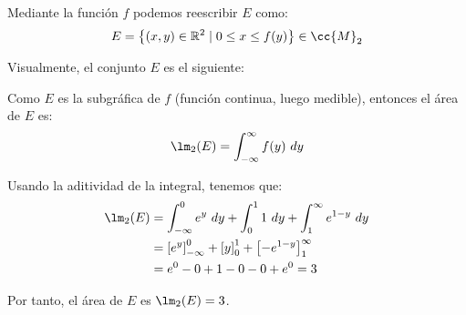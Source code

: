 \begin{ejercicio}
    Mediante la función $f$ podemos reescribir $E$ como:
    \[ E = \left\{ (x, y) \in \mathbb{R}^2 \mid 0 \leq x \leq f(y) \right\}\in \cc{M}_2 \]

    Visualmente, el conjunto $E$ es el siguiente:
    \begin{figure}[H]
        \centering
    \end{figure}

    Como $E$ es la subgráfica de $f$ (función continua, luego medible), entonces el área de $E$ es:
    \begin{equation*}
        \lm_2(E) = \int_{-\infty}^{\infty} f(y)~dy
    \end{equation*}

    Usando la aditividad de la integral, tenemos que:
    \begin{align*}
        \lm_2(E) &= \int_{-\infty}^0 e^y~dy + \int_0^1 1~dy + \int_1^{\infty} e^{1-y}~dy \\
        &= \left[ e^y \right]_{-\infty}^0 + \left[ y \right]_0^1 + \left[ -e^{1-y} \right]_1^{\infty} \\
        &= e^0 - 0 + 1 - 0 - 0 + e^0 = 3
    \end{align*}

    Por tanto, el área de $E$ es $\lm_2(E) = 3$.
\end{ejercicio}

